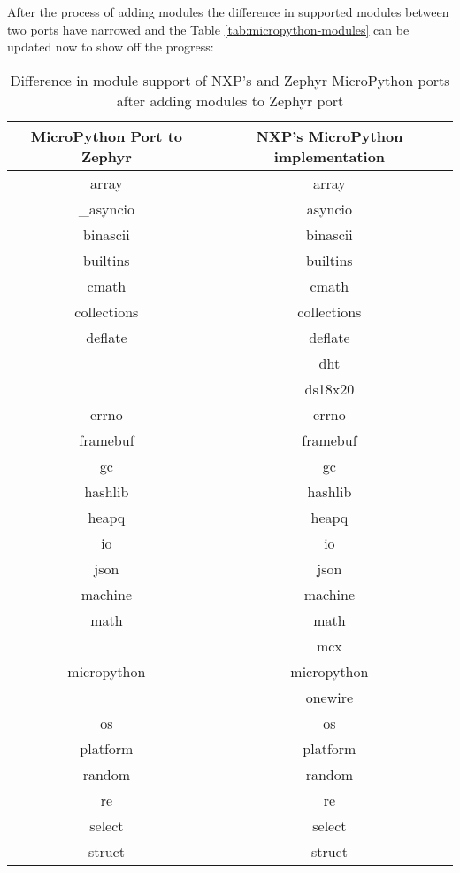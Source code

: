 \documentclass[twoside, 12pt]{article}
\begin{document}
After the process of adding modules the difference in supported modules between two ports 
have narrowed and the Table \ref{tab:micropython-modules} can be updated now to show off the 
progress:

\begin{table}[H]
\centering
\caption{Difference in module support of NXP's and Zephyr MicroPython ports after adding modules to Zephyr port}
\label{tab:micropython-modules-updated}
\renewcommand{\arraystretch}{1.2}
\begin{tabular}{|c|c|} \hline
\textbf{MicroPython Port to Zephyr} & \textbf{NXP's MicroPython implementation} \\ \hline
array & array \\ \hline
\_asyncio & asyncio \\ \hline
binascii & binascii \\ \hline
builtins & builtins \\ \hline
cmath & cmath \\ \hline
collections & collections \\ \hline
deflate & deflate \\ \hline
& dht \\ \hline
& ds18x20 \\ \hline
errno & errno \\ \hline
framebuf & framebuf \\ \hline
gc & gc \\ \hline
hashlib & hashlib \\ \hline
heapq & heapq \\ \hline
io & io \\ \hline
json & json \\ \hline
machine & machine \\ \hline
math & math \\ \hline
& mcx \\ \hline
micropython & micropython \\ \hline
& onewire \\ \hline
os & os \\ \hline
platform & platform \\ \hline
random & random \\ \hline
re & re \\ \hline
select & select \\ \hline
struct & struct \\ \hline
\end{tabular}
\end{table}
\end{document}
